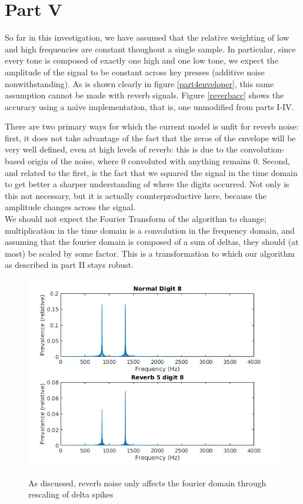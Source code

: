 \documentclass{article}
\begin{document}
\section{Part V}
So far in this investigation, we have assumed that the relative weighting of low and high frequencies are constant thoughout a single sample. In particular, since every tone is composed of exactly one high and one low tone, we expect the amplitude of the signal to be constant across key presses (additive noise nonwithstanding). As is shown clearly in figure \ref{part4enveloper}, this same assumption cannot be made with reverb signals. Figure \ref{reverbacc} shows the accuracy using a naïve implementation, that is, one unmodified from parts I-IV.

There are two primary ways for which the current model is unfit for reverb noise: first, it does not take advantage of the fact that the zeros of the envelope will be very well defined, even at high levels of reverb: this is due to the convolution-based origin of the noise, where 0 convoluted with anything remains 0.
Second, and related to the first, is the fact that we squared the signal in the time domain to get better a sharper understanding of where the digits occurred. Not only is this not necessary, but it is actually counterproductive here, because the amplitude changes across the signal.\\

We should not expect the Fourier Transform of the algorithm to change; multiplication in the time domain is a convolution in the frequency domain, and assuming that the fourier domain is composed of a sum of deltas, they should (at most) be scaled by some factor. This is a transformation to which our algorithm as described in part II stays robust.
\begin{figure}[h]
	\includegraphics[width =\textwidth]{normalvsreverb.jpg}
	\label{normalvsreverb}
	\caption{As discussed, reverb noise only affects the fourier domain through rescaling of delta spikes}
\end{figure}
\end{document}
